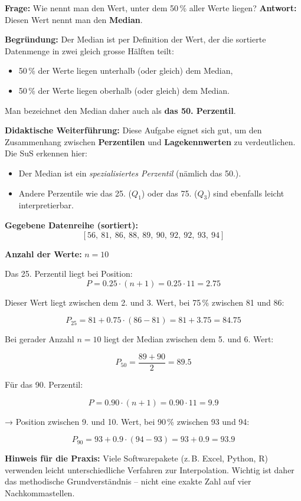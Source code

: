 \begin{aufgabe}{3}

\textbf{Frage:} Wie nennt man den Wert, unter dem 50 \% aller Werte liegen?
\textbf{Antwort:} Diesen Wert nennt man den \textbf{Median}.

\textbf{Begründung:} Der Median ist per Definition der Wert, der die sortierte Datenmenge in zwei gleich grosse Hälften teilt:

\begin{itemize}
  \item 50 \% der Werte liegen unterhalb (oder gleich) dem Median,
  \item 50 \% der Werte liegen oberhalb (oder gleich) dem Median.
\end{itemize}

Man bezeichnet den Median daher auch als \textbf{das 50. Perzentil}.

\textbf{Didaktische Weiterführung:} Diese Aufgabe eignet sich gut, um den Zusammenhang zwischen \textbf{Perzentilen} und \textbf{Lagekennwerten} zu verdeutlichen. Die SuS erkennen hier:

\begin{itemize}
  \item Der Median ist ein \emph{spezialisiertes Perzentil} (nämlich das 50.).
  \item Andere Perzentile wie das 25. ($Q_1$) oder das 75. ($Q_3$) sind ebenfalls leicht interpretierbar.
\end{itemize}

\end{aufgabe}

\begin{aufgabe}{4}

\textbf{Gegebene Datenreihe (sortiert):}
\[
[56,\ 81,\ 86,\ 88,\ 89,\ 90,\ 92,\ 92,\ 93,\ 94]
\]

\textbf{Anzahl der Werte:} $n = 10$

Das 25. Perzentil liegt bei Position:
\[
P = 0.25 \cdot (n + 1) = 0.25 \cdot 11 = 2.75
\]

Dieser Wert liegt zwischen dem 2. und 3. Wert, bei 75 \% zwischen 81 und 86:

\[
P_{25} = 81 + 0.75 \cdot (86 - 81) = 81 + 3.75 = \boxed{84.75}
\]

Bei gerader Anzahl $n = 10$ liegt der Median zwischen dem 5. und 6. Wert:

\[
P_{50} = \frac{89 + 90}{2} = \boxed{89.5}
\]

Für das 90. Perzentil:

\[
P = 0.90 \cdot (n + 1) = 0.90 \cdot 11 = 9.9
\]

→ Position zwischen 9. und 10. Wert, bei 90 \% zwischen 93 und 94:

\[
P_{90} = 93 + 0.9 \cdot (94 - 93) = 93 + 0.9 = \boxed{93.9}
\]

\textbf{Hinweis für die Praxis:} Viele Softwarepakete (z. B. Excel, Python, R) verwenden leicht unterschiedliche Verfahren zur Interpolation. Wichtig ist daher das methodische Grundverständnis – nicht eine exakte Zahl auf vier Nachkommastellen.

\end{aufgabe}


